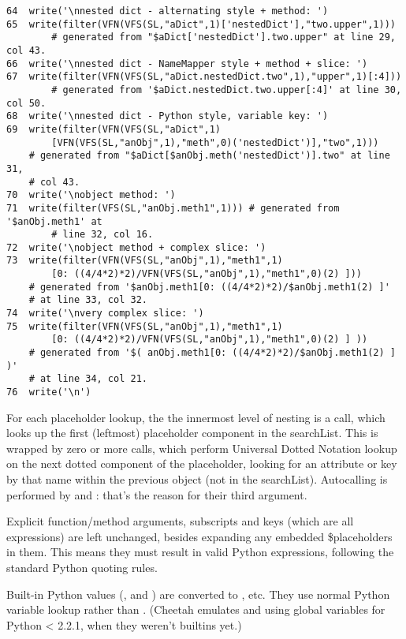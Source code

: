 \begin{verbatim}
64  write('\nnested dict - alternating style + method: ')
65  write(filter(VFN(VFS(SL,"aDict",1)['nestedDict'],"two.upper",1))) 
        # generated from "$aDict['nestedDict'].two.upper" at line 29, col 43.
66  write('\nnested dict - NameMapper style + method + slice: ')
67  write(filter(VFN(VFS(SL,"aDict.nestedDict.two",1),"upper",1)[:4])) 
        # generated from '$aDict.nestedDict.two.upper[:4]' at line 30, col 50.
68  write('\nnested dict - Python style, variable key: ')
69  write(filter(VFN(VFS(SL,"aDict",1)
        [VFN(VFS(SL,"anObj",1),"meth",0)('nestedDict')],"two",1))) 
	# generated from "$aDict[$anObj.meth('nestedDict')].two" at line 31, 
	# col 43.
70  write('\nobject method: ')
71  write(filter(VFS(SL,"anObj.meth1",1))) # generated from '$anObj.meth1' at 
        # line 32, col 16.
72  write('\nobject method + complex slice: ')
73  write(filter(VFN(VFS(SL,"anObj",1),"meth1",1)
        [0: ((4/4*2)*2)/VFN(VFS(SL,"anObj",1),"meth1",0)(2) ])) 
	# generated from '$anObj.meth1[0: ((4/4*2)*2)/$anObj.meth1(2) ]' 
	# at line 33, col 32.
74  write('\nvery complex slice: ')
75  write(filter(VFN(VFS(SL,"anObj",1),"meth1",1)
        [0: ((4/4*2)*2)/VFN(VFS(SL,"anObj",1),"meth1",0)(2) ] )) 
	# generated from '$( anObj.meth1[0: ((4/4*2)*2)/$anObj.meth1(2) ] )' 
	# at line 34, col 21.
76  write('\n')
\end{verbatim}

For each placeholder lookup, the the innermost level of nesting is a 
call, which looks up the first (leftmost) placeholder component in the
searchList.  This is wrapped by zero or more  calls, which perform
Universal Dotted Notation lookup on the next dotted component of the
placeholder, looking for an attribute or key by that name within the previous
object (not in the searchList).  Autocalling is performed by  and
: that's the reason for their third argument.

Explicit function/method arguments, subscripts and keys (which
are all expressions) are left unchanged, besides expanding any embedded
\$placeholders in them.  This means they must result in valid Python
expressions, following the standard Python quoting rules.

Built-in Python values (,  and ) are
converted to , etc.  They use normal Python variable
lookup rather than .  (Cheetah emulates  and 
using global variables for Python < 2.2.1, when they weren't builtins yet.)

